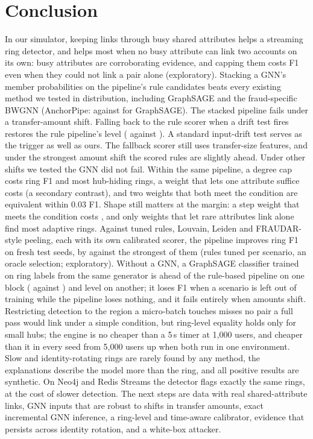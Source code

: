 \section{Conclusion}
In our simulator, keeping links through busy shared attributes helps a
streaming ring detector, and helps most when no busy attribute can link two
accounts on its own: busy attributes are corroborating evidence, and capping them
costs F1 even when they could not link a pair alone (exploratory). Stacking a GNN's member probabilities on
the pipeline's rule candidates beats every existing method we tested in distribution,
including GraphSAGE and the fraud-specific BWGNN (AnchorPipe: \AnTOneanchorF{}
against \AnTOnegnnunscoredF{} for GraphSAGE). The stacked pipeline fails under a
transfer-amount shift. Falling back to the rule scorer when a drift test fires
restores the rule pipeline's level (\AnTTwoanchorF{} against \AnTTwoproposedF{}).
A standard input-drift test serves as the trigger as well as ours. The fallback
scorer still uses transfer-size features, and under the strongest amount shift
the scored rules are slightly ahead. Under other shifts we tested the GNN did not
fail. Within the same
pipeline, a degree cap costs \RfCapD{} ring F1 and most hub-hiding rings, a
weight that lets one attribute suffice costs \RfNdOneD{} (a secondary contrast), and two weights that
both meet the condition are equivalent within 0.03 F1. Shape still matters at the
margin: a step weight that meets the condition costs \RtStepA{}, and only weights
that let rare attributes link alone find most adaptive rings. Against tuned rules,
Louvain, Leiden and FRAUDAR-style peeling, each with its own calibrated scorer,
the pipeline improves ring F1 on fresh test seeds, by \RfExrulesperscenarioDA{}
against the strongest of them (rules tuned per scenario, an oracle selection;
exploratory). Without a GNN, a GraphSAGE classifier trained on ring labels
from the same generator is ahead of the rule-based pipeline on one block
(\RfExgnnunscoredF{} against \RfExproposedF{}) and level on another; it loses
\RtLosoSageDrop{} F1 when a scenario is left out of training while the
pipeline loses nothing, and it fails entirely when amounts shift. Restricting detection to the region a micro-batch
touches misses no pair a full pass would link under a simple condition, but
ring-level equality holds only for small hubs; the engine is no cheaper than a
5\,s timer at 1{,}000 users, and cheaper than it in every seed from 5{,}000
users up when both run in one environment. Slow and
identity-rotating rings are rarely found by any method, the explanations
describe the model more than the ring, and all positive results are synthetic.
On Neo4j and Redis Streams the detector flags exactly the same rings, at the
cost of slower detection. The next steps are data with real shared-attribute
links, GNN inputs that are robust to shifts in transfer amounts, exact
incremental GNN inference, a ring-level and time-aware calibrator, evidence that persists across
identity rotation, and a white-box attacker.

